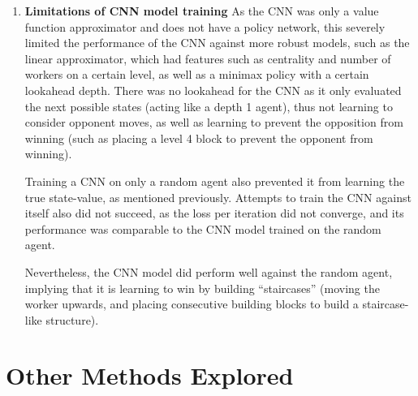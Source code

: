 \documentclass[a4paper,12pt,table]{article}
\begin{document}
\begin{enumerate}
    \item \textbf{Limitations of CNN model training}
    \newline
    As the CNN was only a value function approximator and does not have a policy network, this severely limited the performance of the CNN against more robust models, such as the linear approximator, which had features such as centrality and number of workers on a certain level, as well as a minimax policy with a certain lookahead depth. There was no lookahead for the CNN as it only evaluated the next possible states (acting like a depth 1 agent), thus not learning to consider opponent moves, as well as learning to prevent the opposition from winning (such as placing a level 4 block to prevent the opponent from winning).  \par

    Training a CNN on only a random agent also prevented it from learning the true state-value, as mentioned previously. Attempts to train the CNN against itself also did not succeed, as the loss per iteration did not converge, and its performance was comparable to the CNN model trained on the random agent. \par

    Nevertheless, the CNN model did perform well against the random agent, implying that it is learning to win by building “staircases” (moving the worker upwards, and placing consecutive building blocks to build a staircase-like structure).  \par

\end{enumerate}

\section{Other Methods Explored}
\end{document}

